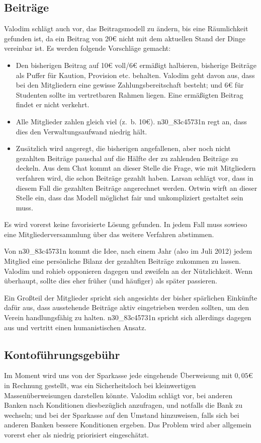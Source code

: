 \documentclass[a4paper,12pt]{scrartcl}
\begin{document}
\subsection{Beiträge}
Valodim schlägt auch vor, das Beitragsmodell zu ändern, bis eine Räumlichkeit
gefunden ist, da ein Beitrag von 20€ nicht mit dem aktuellen Stand der Dinge 
vereinbar ist. Es werden folgende Vorschläge gemacht:
\begin{itemize}
  \item Den bisherigen Beitrag auf 10€ voll/6€ ermäßigt halbieren, bisherige
    Beiträge als Puffer für Kaution, Provision etc. behalten. Valodim geht davon
    aus, dass bei den Mitgliedern eine gewisse Zahlungsbereitschaft besteht; und
    6€ für Studenten sollte im vertretbaren Rahmen liegen. Eine ermäßigten
    Beitrag findet er nicht verkehrt.    
  \item Alle Mitglieder zahlen gleich viel (z.~b. 10€). n30\_83c45731n regt an,
    dass dies den Verwaltungsaufwand niedrig hält.
  \item Zusätzlich wird angeregt, die bisherigen angefallenen, aber noch 
    nicht gezahlten Beiträge pauschal auf die Hälfte der zu zahlenden 
    Beiträge zu deckeln. Aus dem Chat kommt an dieser Stelle die Frage, wie
    mit Mitgliedern verfahren wird, die schon Beiträge gezahlt haben. Larsan
    schlägt vor, dass in diesem Fall die gezahlten Beiträge angerechnet 
    werden. Ortwin wirft an dieser Stelle ein, dass das Modell möglichst fair 
    und unkompliziert gestaltet sein muss.
\end{itemize}

Es wird vorerst keine favorisierte Lösung gefunden. In jedem Fall muss sowieso
eine Mitgliederversammlung über das weitere Verfahren abstimmen.

Von n30\_83c45731n kommt die Idee, nach einem Jahr (also im Juli 2012) jedem 
Mitglied eine persönliche Bilanz der gezahlten Beiträge zukommen zu lassen. 
Valodim und rohieb opponieren dagegen und zweifeln an der Nützlichkeit. 
Wenn überhaupt, sollte dies eher früher (und häufiger) als später passieren.

Ein Großteil der Mitglieder spricht sich angesichts der bisher spärlichen 
Einkünfte dafür aus, dass ausstehende Beiträge aktiv eingetrieben werden 
sollten, um den Verein handlungsfähig zu halten. n30\_83c45731n spricht sich 
allerdings dagegen aus und vertritt einen humanistischen Ansatz.

\subsection{Kontoführungsgebühr}
Im Moment wird uns von der Sparkasse jede eingehende Überweisung mit $0{,}05$€ 
in Rechnung gestellt, was ein Sicherheitsloch bei kleinwertigen 
Massenüberweisungen darstellen könnte. Valodim schlägt vor, bei anderen Banken
nach Konditionen diesbezüglich anzufragen, und notfalls die Bank zu wechseln; 
und bei der Sparkasse auf den Umstand hinzuweisen, falls sich bei anderen Banken
bessere Konditionen ergeben. Das Problem wird aber allgemein vorerst eher als
niedrig priorisiert eingeschätzt.
\end{document}
